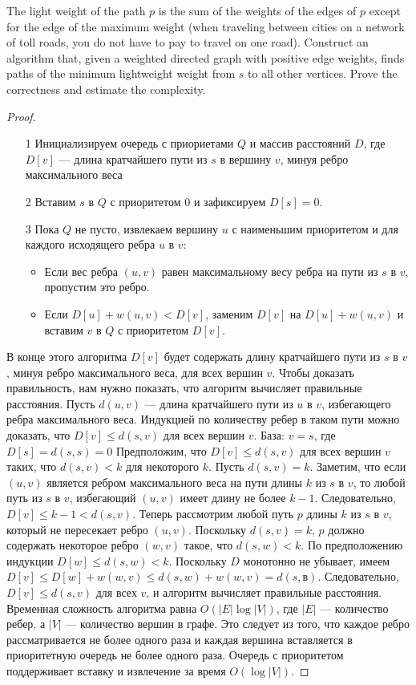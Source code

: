 \begin{prob}
The light weight of the path $p$ is the sum of the weights of the edges of $p$ except for the edge of the maximum weight (when traveling between cities on a network of toll roads, you do not have to pay to travel on one road). Construct an algorithm that, given a weighted directed graph with positive edge weights, finds paths of the minimum lightweight weight from $s$ to all other vertices. Prove the correctness and estimate the complexity.
\end{prob}
\vskip 0.2in
\begin{proof}
\begin{itemize}
\item[]
\item[1] Инициализируем очередь с приориетами $Q$ и массив расстояний $D$, где $D[v]$ — длина кратчайшего пути из $s$ в вершину $v$, минуя ребро максимального веса
\item[2] Вставим $s$ в $Q$ с приоритетом $0$ и зафиксируем $D[s] = 0$.
\item[3] Пока $Q$ не пусто, извлекаем вершину $u$ с наименьшим приоритетом и для каждого исходящего ребра $u$ в $v$:
     \begin{itemize}
        \item Если вес ребра $(u,v)$ равен максимальному весу ребра на пути из $s$ в $v$, пропустим это ребро.
        \item Если $D[u] + w(u,v) < D[v]$, заменим $D[v]$ на $D[u] + w(u,v)$ и вставим $v$ в $Q$ с приоритетом $D[v]$.
     \end{itemize}
\end{itemize}

В конце этого алгоритма $D[v]$ будет содержать длину кратчайшего пути из $s$ в $v$, минуя ребро максимального веса, для всех вершин $v$. Чтобы доказать правильность, нам нужно показать, что алгоритм вычисляет правильные расстояния. Пусть $d(u,v)$ — длина кратчайшего пути из $u$ в $v$, избегающего ребра максимального веса. Индукцией по количеству ребер в таком пути можно доказать, что $D[v] \leq d(s,v)$ для всех вершин $v$.
\vskip 0.1in
База: $v=s$, где $D[s]=d(s,s)=0$
\vskip 0.1in
Предположим, что $D[v] \leq d(s,v)$ для всех вершин $v$ таких, что $d(s,v) < k$ для некоторого $k$. Пусть $d(s,v)=k$. Заметим, что если $(u,v)$ является ребром максимального веса на пути длины $k$ из $s$ в $v$, то любой путь из $s$ в $v$, избегающий $(u,v)$ имеет длину не более $k-1$. Следовательно, $D[v] \leq k-1 < d(s,v)$. Теперь рассмотрим любой путь $p$ длины $k$ из $s$ в $v$, который не пересекает ребро $(u,v)$. Поскольку $d(s,v)=k$, $p$ должно содержать некоторое ребро $(w,v)$ такое, что $d(s,w) < k$. По предположению индукции $D[w] \leq d(s,w) < k$. Поскольку $D$ монотонно не убывает, имеем $D[v] \leq D[w] + w(w,v) \leq d(s,w) + w(w,v) = d(s, в) $. Следовательно, $D[v] \leq d(s,v)$ для всех $v$, и алгоритм вычисляет правильные расстояния.
\vskip 0.1in
Временная сложность алгоритма равна $O(|E|\log|V|)$, где $|E|$ — количество ребер, а $|V|$ — количество вершин в графе. Это следует из того, что каждое ребро рассматривается не более одного раза и каждая вершина вставляется в приоритетную очередь не более одного раза. Очередь с приоритетом поддерживает вставку и извлечение за время $O(\log |V|)$.
\end{proof}
